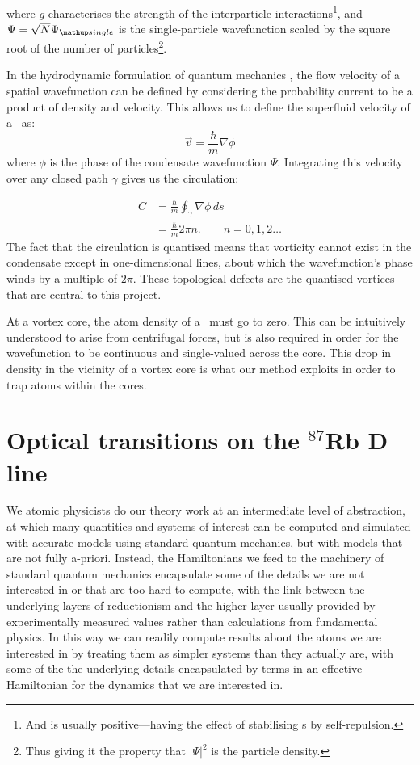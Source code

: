 where $g$ characterises the strength of the interparticle interactions\footnote{And is usually positive---having the effect of stabilising \bec s by self-repulsion.}, and $\Psi = \sqrt{N}\Psi_\up{single}$ is the single-particle wavefunction scaled by the square root of the number of particles\footnote{Thus giving it the property that $|\Psi|^2$ is the particle density.}.

In the hydrodynamic formulation of quantum mechanics \cite{madelung_quantentheorie_1927}, the flow velocity of a spatial wavefunction can be defined by considering the probability current to be a product of density and velocity. This allows us to define the superfluid velocity of a \bec\ as:
\begin{equation}
\vec v = \frac\hbar m \nabla\phi
\end{equation}
where $\phi$ is the phase of the condensate wavefunction $\Psi$. Integrating this velocity over any closed path $\gamma$ gives us the circulation:

\begin{align}
C &= \frac\hbar m\oint_\gamma\nabla\phi\,ds\\
  &= \frac\hbar m 2\pi n.\qquad n=0,1,2\dots
\end{align}
The fact that the circulation is quantised means that vorticity cannot exist in the condensate except in one-dimensional lines, about which the wavefunction's phase winds by a multiple of $2\pi$. These topological defects are the quantised vortices that are central to this project.

At a vortex core, the atom density of a \bec\ must go to zero. This can be intuitively understood to arise from centrifugal forces, but is also required in order for the wavefunction to be continuous and single-valued across the core. This drop in density in the vicinity of a vortex core is what our method exploits in order to trap atoms within the cores.

\section{Optical transitions on the $^{87}$Rb D line}

We atomic physicists do our theory work at an intermediate level of abstraction, at which many quantities and systems of interest can be computed and simulated with accurate models using standard quantum mechanics, but with models that are not fully a-priori. Instead, the Hamiltonians we feed to the machinery of standard quantum mechanics encapsulate some of the details we are not interested in or that are too hard to compute, with the link between the underlying layers of reductionism and the higher layer usually provided by experimentally measured values rather than calculations from fundamental physics. In this way we can readily compute results about the atoms we are interested in by treating them as simpler systems than they actually are, with some of the the underlying details encapsulated by terms in an effective Hamiltonian for the dynamics that we are interested in.

